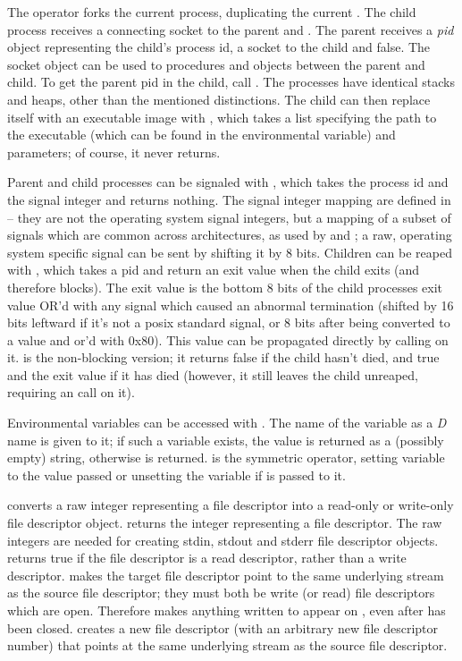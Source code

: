The  operator forks the current process, duplicating the
current . The child process receives a connecting socket to
the parent and . The parent receives a \emph{pid} object
representing the child's process id, a socket to the child and
false. The socket object can be used to  procedures and
objects between the parent and child. To get the parent pid in the
child, call . The processes have identical stacks and
heaps, other than the mentioned distinctions. The child can then
replace itself with an executable image with , which takes a
list specifying the path to the executable (which can be found in the
 environmental variable) and parameters; of course, it
never returns.

Parent and child processes can be signaled with , which
takes the process id and the signal integer and returns nothing. The
signal integer mapping are defined in  -- they are not
the operating system signal integers, but a mapping of a subset of
signals which are common across architectures, as used by 
and ; a raw, operating system specific signal can be sent
by shifting it by 8 bits. Children can be reaped with ,
which takes a pid and return an exit value when the child exits (and
therefore blocks). The exit value is the bottom 8 bits of the child
processes exit value OR'd with any signal which caused an abnormal
termination (shifted by 16 bits leftward if it's not a posix standard
signal, or 8 bits after being converted to a  value and
or'd with 0x80). This value can be propagated directly by calling
 on it.  is the non-blocking version; it returns
false if the child hasn't died, and true and the exit value if it has
died (however, it still leaves the child unreaped, requiring an
 call on it).

Environmental variables can be accessed with . The name of
the variable as a \emph{D} name is given to it; if such a variable
exists, the value is returned as a (possibly empty) string, otherwise
 is returned.  is the symmetric operator,
setting  variable to the value passed or unsetting the
variable if  is passed to it.

 converts a raw integer representing a file descriptor into
a read-only or write-only file descriptor object. 
returns the integer representing a file descriptor. The raw integers
are needed for creating stdin, stdout and stderr file descriptor
objects.  returns true if the file descriptor is a read
descriptor, rather than a write descriptor.  makes the
target file descriptor point to the same underlying stream as the
source file descriptor; they must both be write (or read) file
descriptors which are open. Therefore  
 makes anything written to  appear on
, even after  has been
closed.  creates a new file descriptor (with an arbitrary
new file descriptor number) that points at the same underlying stream
as the source file descriptor.

